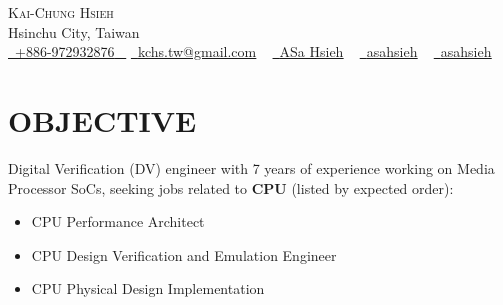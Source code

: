 \documentclass[letterpaper,11pt]{article}
\newcommand{\resumeItem}[1]{
  \item\small{
    {#1 \vspace{-0.5pt}}
  }
}
\newcommand{\resumeItemListStart}{\begin{itemize}}
\newcommand{\resumeItemListEnd}{\end{itemize}\vspace{-5pt}}
\begin{document}


\begin{center}
    {\Huge \scshape Kai-Chung Hsieh} \\ \vspace{1pt}
    Hsinchu City, Taiwan \\ \vspace{1pt}
    \small \href{tel:+886972932876}{ \raisebox{-0.1\height}\faPhone\ \underline{+886-972932876} ~} \href{mailto:kchs.tw@gmail.com}{\raisebox{-0.2\height}\faGoogle\  \underline{kchs.tw@gmail.com}} ~ 
    \href{https://linkedin.com/in/asa-hsieh}{\raisebox{-0.2\height}\faLinkedinSquare\ \underline{ASa Hsieh}}  ~
    \href{https://github.com/asahsieh}{\raisebox{-0.2\height}\faGithub\ \underline{asahsieh}} ~
    \href{https://hackmd.io/@asahsieh}{\raisebox{-0.2\height}\faBook\ \underline{asahsieh}} ~
    \vspace{-8pt}
\end{center}
 

\section{OBJECTIVE}
    {Digital Verification (DV) engineer with 7 years of experience working on Media Processor SoCs, seeking jobs related to \textbf{CPU} (listed by expected order):}
        \resumeItemListStart
            \resumeItem{\normalsize{CPU Performance Architect \href{https://careers.google.com/jobs/results/106694213048902342/}{\raisebox{-0.1\height}\faExternalLink }}}
            \vspace{-5pt}
            \resumeItem{\normalsize{CPU Design Verification and Emulation Engineer \href{https://careers.google.com/jobs/results/103455667181757126/}{\raisebox{-0.1\height}\faExternalLink }}}
             \vspace{-5pt}
            \resumeItem{\normalsize{CPU Physical Design Implementation \href{https://careers.google.com/jobs/results/90401417669288646/}{\raisebox{-0.1\height}\faExternalLink }}}
        \resumeItemListEnd
    \vspace{-6pt}
     
\end{document}
